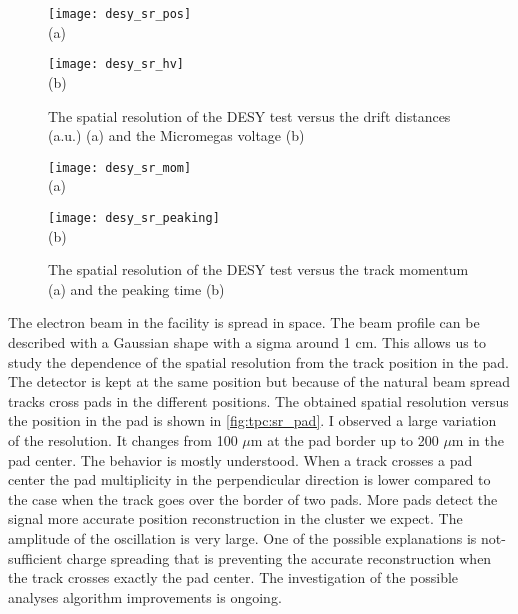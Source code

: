 \documentclass[../main.tex]{subfiles}
\begin{document}
\begin{figure}[!ht]
  \centering
  \begin{minipage}{0.49\linewidth}
    \centering
    \texttt{[image: desy\_sr\_pos]} \\ (a)
  \end{minipage}
  \begin{minipage}{0.49\linewidth}
    \centering
    \texttt{[image: desy\_sr\_hv]} \\ (b)
  \end{minipage}
  \caption{The spatial resolution of the DESY test versus the drift distances (a.u.) (a) and the Micromegas voltage (b)}
  \label{fig:tpc:sr1}
\end{figure}

\begin{figure}[!ht]
  \centering
  \begin{minipage}{0.49\linewidth}
    \centering
    \texttt{[image: desy\_sr\_mom]} \\ (a)
  \end{minipage}
  \begin{minipage}{0.49\linewidth}
    \centering
    \texttt{[image: desy\_sr\_peaking]} \\ (b)
  \end{minipage}
  \caption{The spatial resolution of the DESY test versus the track momentum (a) and the peaking time (b)}
  \label{fig:tpc:sr2}
\end{figure}

The electron beam in the facility is spread in space. The beam profile can be described with a Gaussian shape with a sigma around 1 cm. This allows us to study the dependence of the spatial resolution from the track position in the pad. The detector is kept at the same position but because of the natural beam spread tracks cross pads in the different positions. The obtained spatial resolution versus the position in the pad is shown in \autoref{fig:tpc:sr_pad}. I observed a large variation of the resolution. It changes from 100 $\mu\text{m}$ at the pad border up to 200 $\mu\text{m}$ in the pad center. The behavior is mostly understood. When a track crosses a pad center the pad multiplicity in the perpendicular direction is lower compared to the case when the track goes over the border of two pads. More pads detect the signal more accurate position reconstruction in the cluster we expect. The amplitude of the oscillation is very large. One of the possible explanations is not-sufficient charge spreading that is preventing the accurate reconstruction when the track crosses exactly the pad center. The investigation of the possible analyses algorithm improvements is ongoing.
\end{document}
